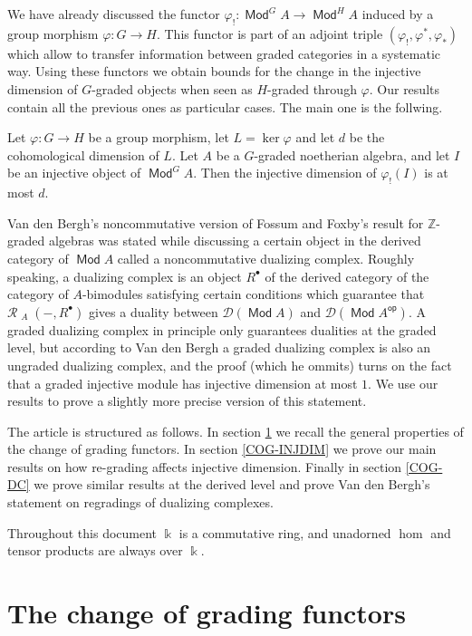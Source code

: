 \documentclass[11pt,fleqn]{article}
\newcommand\ZZ{\mathbb Z}
\renewcommand\to{\longrightarrow}
\renewcommand\phi{\varphi}
\renewcommand\k{\Bbbk}
\newcommand\R{\mathcal R}
\newcommand\op{\mathsf{op}}
\newcommand\D{\mathcal D}
\DeclareMathOperator\Mod{\mathsf{Mod}}
\DeclareMathOperator\HOM{\underline{\mathsf{Hom}}}
\begin{document}
We have already discussed the functor $\phi_!: \Mod^G A \to \Mod^H A$ induced
by a group morphism $\phi: G \to H$. This functor is part of an adjoint triple
$(\phi_!, \phi^*, \phi_*)$ which allow to transfer information between graded 
categories in a systematic way. Using these functors we obtain bounds for the
change in the injective dimension of $G$-graded objects when seen as 
$H$-graded through $\phi$. Our results contain all the previous ones as 
particular cases. The main one is the follwing.
\begin{Theorem*}
Let $\phi: G \to H$ be a group morphism, let $L = \ker \phi$ and let $d$ be 
the cohomological dimension of $L$. Let $A$ be a $G$-graded noetherian 
algebra, and let $I$ be an injective object of $\Mod^G A$. Then the injective
dimension of $\phi_!(I)$ is at most $d$.
\end{Theorem*}

Van den Bergh's noncommutative version of Fossum and Foxby's result for 
$\ZZ$-graded algebras was stated while discussing a certain object in the 
derived category of $\Mod A$ called a noncommutative dualizing complex. 
Roughly speaking, a dualizing complex is an object $R^\bullet$ of the derived 
category of the category of $A$-bimodules satisfying certain conditions which 
guarantee that $\R\HOM_A(-, R^\bullet)$ gives a duality between $\D(\Mod A)$ 
and $\D(\Mod A^\op)$. A graded dualizing complex in principle only guarantees 
dualities at the graded level, but according to Van den Bergh a graded 
dualizing complex is also an ungraded dualizing complex, and the proof (which
he ommits) turns on the fact that a graded injective module has injective 
dimension at most $1$. We use our results to prove a slightly more precise
version of this statement.

The article is structured as follows. In section \ref{COG-FUNCTORS} we recall
the general properties of the change of grading functors. In section 
\ref{COG-INJDIM} we prove our main results on how re-grading affects
injective dimension. Finally in section \ref{COG-DC} we prove similar results
at the derived level and prove Van den Bergh's statement on regradings of 
dualizing complexes.

Throughout this document $\k$ is a commutative ring, and unadorned $\hom$ and 
tensor products are always over $\k$. 

\section{The change of grading functors}
\label{COG-FUNCTORS}
\end{document}
